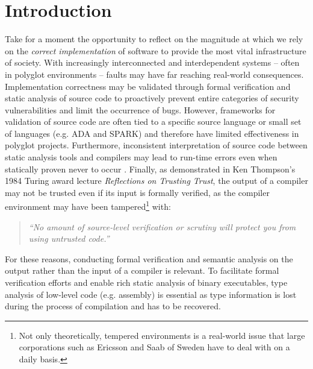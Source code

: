 
\section{Introduction}


Take for a moment the opportunity to reflect on the magnitude at which we rely on the \textit{correct implementation} of software to provide the most vital infrastructure of society. With increasingly interconnected and interdependent systems -- often in polyglot environments -- faults may have far reaching real-world consequences. Implementation correctness may be validated through formal verification and static analysis of source code to proactively prevent entire categories of security vulnerabilities and limit the occurrence of bugs. However, frameworks for validation of source code are often tied to a specific source language or small set of languages (e.g. ADA and SPARK) and therefore have limited effectiveness in polyglot projects. Furthermore, inconsistent interpretation of source code between static analysis tools and compilers may lead to run-time errors even when statically proven never to occur \cite{ada_static_analysis_and_compiler_inconsistencies,wysinwyx}. Finally, as demonstrated in Ken Thompson's 1984 Turing award lecture \textit{Reflections on Trusting Trust}, the output of a compiler may not be trusted even if its input is formally verified, as the compiler environment may have been tampered\footnote{Not only theoretically, tempered environments is a real-world issue that large corporations such as Ericsson and Saab of Sweden have to deal with on a daily basis.} with:

\begin{quote}
	\textit{``No amount of source-level verification or scrutiny will protect you from using untrusted code.''} \cite{trusting_trust}
\end{quote}

For these reasons, conducting formal verification and semantic analysis on the output rather than the input of a compiler is relevant. To facilitate formal verification efforts and enable rich static analysis of binary executables, type analysis of low-level code (e.g. assembly) is essential as type information is lost during the process of compilation and has to be recovered.

